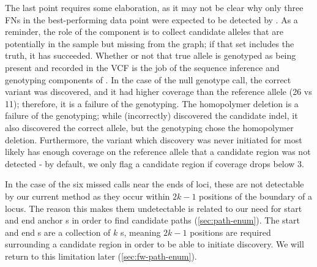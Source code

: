 The last point requires some elaboration, as it may not be clear why only three FNs in the best-performing data point were expected to be detected by \denovo{}. As a reminder, the role of the \denovo{} component is to collect candidate alleles that are potentially in the sample but missing from the graph; if that set includes the truth, it has succeeded. Whether or not that true allele is genotyped as being present and recorded in the VCF is the job of the sequence inference and genotyping components of \pandora{}. In the case of the null genotype call, the correct variant was discovered, and it had higher coverage than the reference allele (26 vs 11); therefore, it is a failure of the genotyping. The homopolymer deletion is a failure of the genotyping; while \denovo{} (incorrectly) discovered the candidate indel, it also discovered the correct allele, but the genotyping chose the homopolymer deletion. Furthermore, the variant which \denovo{} discovery was never initiated for most likely has enough coverage on the reference allele that a candidate region was not detected - by default, we only flag a candidate region if coverage drops below 3.

In the case of the six missed calls near the ends of loci, these are not detectable by our current \denovo{} method as they occur within $2k-1$ positions of the boundary of a locus. The reason this makes them undetectable is related to our need for start and end anchor \kmer{}s in order to find candidate paths (\autoref{sec:path-enum}). The start and end \kmer{}s are a collection of $k$ \kmer{}s, meaning $2k-1$ positions are required surrounding a candidate region in order to be able to initiate \denovo{} discovery. We will return to this limitation later (\autoref{sec:fw-path-enum}).

